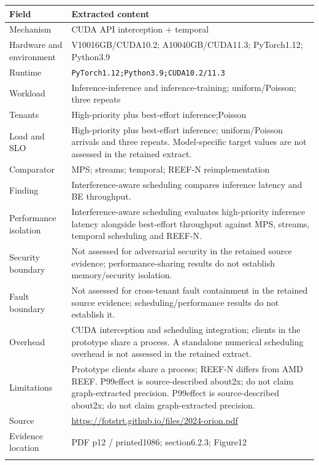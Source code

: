 \begin{longtable}{>{\raggedright\arraybackslash}p{}>{\raggedright\arraybackslash}p{}}
\toprule
\textbf{Field} & \textbf{Extracted content}\\\midrule\endhead
Mechanism & CUDA API interception + temporal\\\addlinespace
Hardware and environment & V10016GB/CUDA10.2; A10040GB/CUDA11.3; PyTorch1.12; Python3.9\\\addlinespace
Runtime & \nolinkurl{PyTorch1.12;Python3.9;CUDA10.2/11.3}\\\addlinespace
Workload & Inference-inference and inference-training; uniform/Poisson; three repeats\\\addlinespace
Tenants & High-priority plus best-effort inference;Poisson\\\addlinespace
Load and SLO & High-priority plus best-effort inference; uniform/Poisson arrivals and three repeats. Model-specific target values are not assessed in the retained extract.\\\addlinespace
Comparator & MPS; streams; temporal; REEF-N reimplementation\\\addlinespace
Finding & Interference-aware scheduling compares inference latency and BE throughput.\\\addlinespace
Performance isolation & Interference-aware scheduling evaluates high-priority inference latency alongside best-effort throughput against MPS, streams, temporal scheduling and REEF-N.\\\addlinespace
Security boundary & Not assessed for adversarial security in the retained source evidence; performance-sharing results do not establish memory/security isolation.\\\addlinespace
Fault boundary & Not assessed for cross-tenant fault containment in the retained source evidence; scheduling/performance results do not establish it.\\\addlinespace
Overhead & CUDA interception and scheduling integration; clients in the prototype share a process. A standalone numerical scheduling overhead is not assessed in the retained extract.\\\addlinespace
Limitations & Prototype clients share a process; REEF-N differs from AMD REEF. P99effect is source-described about2x; do not claim graph-extracted precision. P99effect is source-described about2x; do not claim graph-extracted precision.\\\addlinespace
Source & \url{https://fotstrt.github.io/files/2024-orion.pdf}\\\addlinespace
Evidence location & PDF p12 / printed1086; section6.2.3; Figure12\\\addlinespace
\bottomrule\end{longtable}

